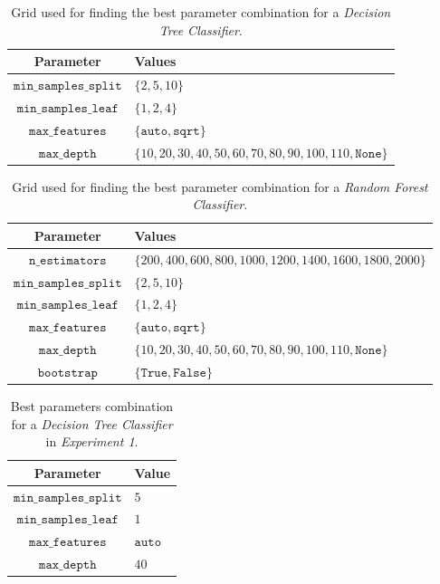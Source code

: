\documentclass[sigplan,screen]{acmart}
\begin{document}
\begin{table}[h]
  \caption{Grid used for finding the best parameter combination for a \emph{Decision Tree Classifier}.}
  \label{tab:grid_dt}
  \begin{tabular}{cl}
    \toprule
    \textbf{Parameter}&\textbf{Values}\\
    \midrule
    $\texttt{min\_samples\_split}$ & $\{2, 5, 10\}$ \\
    $\texttt{min\_samples\_leaf}$ & $\{1, 2, 4\}$ \\
    $\texttt{max\_features}$ & $\{\texttt{auto}, \texttt{sqrt}\}$ \\
    $\texttt{max\_depth}$ & $\{10, 20, 30, 40, 50, 60, 70, 80, 90, 100, 110, \texttt{None}\}$ \\
    \bottomrule
    \end{tabular}
\end{table}

\begin{table}[h]
  \caption{Grid used for finding the best parameter combination for a \emph{Random Forest Classifier}.}
  \label{tab:grid_rf}
  \begin{tabular}{cl}
    \toprule
    \textbf{Parameter}&\textbf{Values}\\
    \midrule
    $\texttt{n\_estimators}$ & $\{200, 400, 600, 800, 1000, 1200, 1400, 1600, 1800, 2000\}$\\
    $\texttt{min\_samples\_split}$ & $\{2, 5, 10\}$ \\
    $\texttt{min\_samples\_leaf}$ & $\{1, 2, 4\}$ \\
    $\texttt{max\_features}$ & $\{\texttt{auto}, \texttt{sqrt}\}$ \\
    $\texttt{max\_depth}$ & $\{10, 20, 30, 40, 50, 60, 70, 80, 90, 100, 110, \texttt{None}\}$ \\
    $\texttt{bootstrap}$ & $\{\texttt{True}, \texttt{False}\}$
    \bottomrule
    \end{tabular}
\end{table}

\begin{table}[h]
  \caption{Best parameters combination for a \emph{Decision Tree Classifier} in \emph{Experiment 1}.}
  \label{tab:dc_1}
  \begin{tabular}{cl}
    \toprule
    \textbf{Parameter}&\textbf{Value}\\
    \midrule
    $\texttt{min\_samples\_split}$ & $5$ \\
    $\texttt{min\_samples\_leaf}$ & $1$ \\
    $\texttt{max\_features}$ & $\texttt{auto}$ \\
    $\texttt{max\_depth}$ & $40$ \\
    \bottomrule
    \end{tabular}
\end{table}
\end{document}
